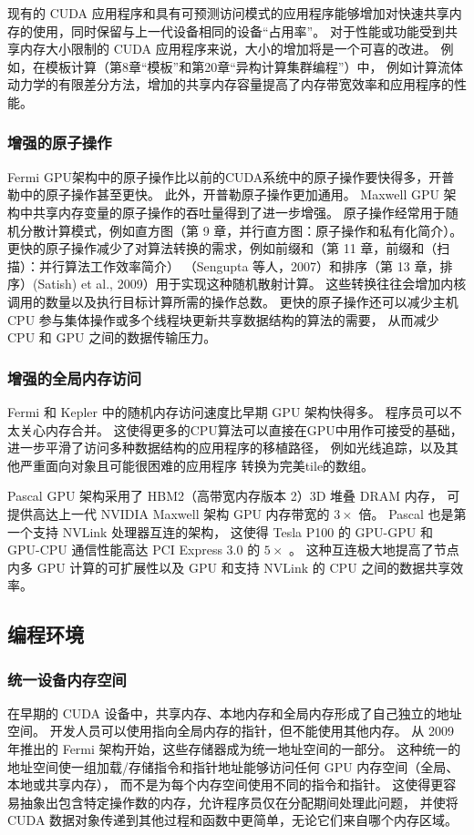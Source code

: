现有的 CUDA 应用程序和具有可预测访问模式的应用程序能够增加对快速共享内存的使用，同时保留与上一代设备相同的设备“占用率”。 
对于性能或功能受到共享内存大小限制的 CUDA 应用程序来说，大小的增加将是一个可喜的改进。 
例如，在模板计算（第8章“模板”和第20章“异构计算集群编程”）中，
例如计算流体动力学的有限差分方法，增加的共享内存容量提高了内存带宽效率和应用程序的性能。

\subsubsection{增强的原子操作}
Fermi GPU架构中的原子操作比以前的CUDA系统中的原子操作要快得多，开普勒中的原子操作甚至更快。 
此外，开普勒原子操作更加通用。 Maxwell GPU 架构中共享内存变量的原子操作的吞吐量得到了进一步增强。 
原子操作经常用于随机分散计算模式，例如直方图（第 9 章，并行直方图：原子操作和私有化简介）。 
更快的原子操作减少了对算法转换的需求，例如前缀和（第 11 章，前缀和（扫描）：并行算法工作效率简介）
（Sengupta 等人，2007）和排序（第 13 章，排序）(Satish) et al., 2009）用于实现这种随机散射计算。 
这些转换往往会增加内核调用的数量以及执行目标计算所需的操作总数。 
更快的原子操作还可以减少主机 CPU 参与集体操作或多个线程块更新共享数据结构的算法的需要，
从而减少 CPU 和 GPU 之间的数据传输压力。

\subsubsection{增强的全局内存访问}
Fermi 和 Kepler 中的随机内存访问速度比早期 GPU 架构快得多。 程序员可以不太关心内存合并。 
这使得更多的CPU算法可以直接在GPU中用作可接受的基础，进一步平滑了访问多种数据结构的应用程序的移植路径，
例如光线追踪，以及其他严重面向对象且可能很困难的应用程序 转换为完美tile的数组。

Pascal GPU 架构采用了 HBM2（高带宽内存版本 2）3D 堆叠 DRAM 内存，
可提供高达上一代 NVIDIA Maxwell 架构 GPU 内存带宽的 $3 \times$ 倍。 
Pascal 也是第一个支持 NVLink 处理器互连的架构，
这使得 Tesla P100 的 GPU-GPU 和 GPU-CPU 通信性能高达 PCI Express 3.0 的 $5 \times$ 。 
这种互连极大地提高了节点内多 GPU 计算的可扩展性以及 GPU 和支持 NVLink 的 CPU 之间的数据共享效率。

\subsection{编程环境}
\subsubsection{统一设备内存空间}
在早期的 CUDA 设备中，共享内存、本地内存和全局内存形成了自己独立的地址空间。 
开发人员可以使用指向全局内存的指针，但不能使用其他内存。 
从 2009 年推出的 Fermi 架构开始，这些存储器成为统一地址空间的一部分。 
这种统一的地址空间使一组加载/存储指令和指针地址能够访问任何 GPU 内存空间（全局、本地或共享内存），
而不是为每个内存空间使用不同的指令和指针。 
这使得更容易抽象出包含特定操作数的内存，允许程序员仅在分配期间处理此问题，
并使将 CUDA 数据对象传递到其他过程和函数中更简单，无论它们来自哪个内存区域。

